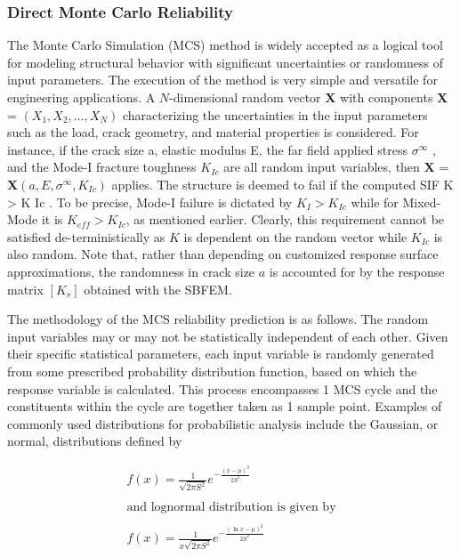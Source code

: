 \documentclass[12pt]{article}
\begin{document}
\subsubsection{Direct Monte Carlo Reliability}
The Monte Carlo Simulation (MCS) method is widely accepted as a logical tool for modeling structural behavior with significant 
uncertainties or randomness of input parameters. The execution of the method is very simple and versatile for
engineering applications. A $N$-dimensional random vector {\bf X} with components {\bf X} = $(X_1 , X_2 , . . . , X_N )$ characterizing the 
uncertainties in the input parameters such as the load, crack geometry, and material properties is considered. For instance, if
the crack size a, elastic modulus E, the far field applied stress $\sigma^\infty$ , and the Mode-I fracture toughness $K_{Ic}$ are all random input
variables, then \textbf{X} = \textbf{X}$(a, E, \sigma^\infty , K_{Ic} )$ applies. The structure is deemed to fail if the computed SIF K > K Ic . To be precise, Mode-I
failure is dictated by $K_I > K_{Ic}$ while for Mixed-Mode it is ${K_{eff} > K_{Ic} }$, as mentioned earlier. Clearly, this
requirement cannot be satisfied de-terministically as $K$ is dependent on the random vector while $K_{Ic}$ is also random. Note
that, rather than depending on customized response surface approximations, the randomness in crack size $a$ is accounted
for by the response matrix $[K_s ]$ obtained with the SBFEM.

The methodology of the MCS reliability prediction is as follows. The random input variables may or may not be statistically 
independent of each other. Given their specific statistical parameters, each input variable is randomly generated from
some prescribed probability distribution function, based on which the response variable is calculated. This process encompasses 1 MCS 
cycle and the constituents within the cycle are together taken as 1 sample point. Examples of commonly used
distributions for probabilistic analysis include the Gaussian, or normal, distributions defined by


\begin{align*}
    f(x) = \frac{1}{\sqrt{2 \pi S^2}}e^{-\frac{(x - \mu )^2}{2 S^2}}\\~\\
\text{and lognormal distribution is given by}\\~\\
    f(x) = \frac{1}{x\sqrt{2 \pi S^2}}e^{-\frac{(\ln x - \mu )^2}{2 S^2}}\\ \tag{28}
\end{align*}
\end{document}
